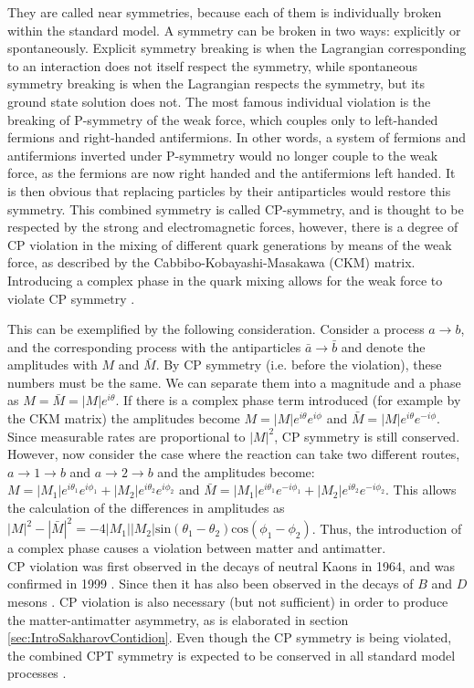 They are called near symmetries, because each of them is individually broken within the standard model. A symmetry can be broken in two ways: explicitly or spontaneously. Explicit symmetry breaking is when the Lagrangian corresponding to an interaction does not itself respect the symmetry, while spontaneous symmetry breaking is when the Lagrangian respects the symmetry, but its ground state solution does not. The most famous individual violation is the breaking of P-symmetry of the weak force, which couples only to left-handed fermions and right-handed antifermions. In other words, a system of fermions and antifermions inverted under P-symmetry would no longer couple to the weak force, as the fermions are now right handed and the antifermions left handed. It is then obvious that replacing particles by their antiparticles would restore this symmetry. This combined symmetry is called CP-symmetry, and is thought to be respected by the strong and electromagnetic forces, however, there is a degree of CP violation in the mixing of different quark generations by means of the weak force, as described by the Cabbibo-Kobayashi-Masakawa (CKM) matrix. Introducing a complex phase in the quark mixing allows for the weak force to violate CP symmetry \cite{Pich:256553}. 

This can be exemplified by the following consideration. Consider a process $a \rightarrow b$, and the corresponding process with the antiparticles $\bar{a} \rightarrow \bar{b}$ and denote the amplitudes with $M$ and $\bar{M}$. By CP symmetry (i.e. before the violation), these numbers must be the same. We can separate them into a magnitude and a phase as $M = \bar{M} = |M|e^{i\theta}$. If there is a complex phase term introduced (for example by the CKM matrix) the amplitudes become $M = |M|e^{i\theta}e^{i\phi}$ and $\bar{M} = |M|e^{i\theta}e^{-i\phi}$. Since measurable rates are proportional to $|M|^2$, CP symmetry is still conserved. However, now consider the case where the reaction can take two different routes, $a \rightarrow 1 \rightarrow b$ and $a \rightarrow 2 \rightarrow b$ and the amplitudes become: $M = |M_1|e^{i\theta_1}e^{i\phi_1} + |M_2|e^{i\theta_2}e^{i\phi_2}$ and $\bar{M} = |M_1|e^{i\theta_1}e^{-i\phi_1} + |M_2|e^{i\theta_2}e^{-i\phi_2}$. This allows the calculation of the differences in amplitudes as $|M|^2 - |\bar{M}|^2 = -4|M_1||M_2|\mathrm{sin}(\theta_1 - \theta_2)\mathrm{cos}(\phi_1 - \phi_2)$. Thus, the introduction of a complex phase causes a violation between matter and antimatter. \\
CP violation was first observed in the decays of neutral Kaons \cite{CP_violations_early} in 1964, and was confirmed in 1999 \cite{CP_violations_proof}. Since then it has also been observed in the decays of $B$ and $D$ mesons \cite{CP_violation_B, CP_violation_D}. CP violation is also necessary (but not sufficient) in order to produce the matter-antimatter asymmetry, as is elaborated in section \ref{sec:IntroSakharovContidion}. Even though the CP symmetry is being violated, the combined CPT symmetry is expected to be conserved in all standard model processes \cite{CPT_data_2011, CPT_status_1998}. 

